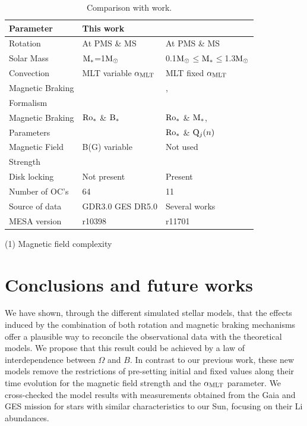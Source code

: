 \documentclass[fleqn,usenatbib]{mnras}
\begin{document}
\begin{table}
	\centering
	\caption{Comparison with \cite{Gossage2021} work.}
	\label{tab:gassage_vs_navarro}
        \begin{threeparttable}
	\begin{tabular}{lll} 
		\hline
		Parameter & This work & \cite{Gossage2021}\\
		\hline
            
		Rotation & At PMS \& MS & At PMS \& MS\\
  		Solar Mass & $\mathrm{M}_*$=1$\mathrm{M}_\odot$ & 0.1$\mathrm{M}_\odot$$\le$$\mathrm{M}_*$$\le$1.3$\mathrm{M}_\odot$ \\
		Convection & MLT variable $\alpha_{{\rm MLT}}$ & MLT fixed $\alpha_{{\rm MLT}}$\\
		Magnetic Braking & \cite{Gallet2013} & \cite{Matt2015}, \\ Formalism & & \cite{Garraffo2018}\\
            Magnetic Braking & $\mathrm{Ro}_*$ \& $\mathrm{B}_*$ & $\mathrm{Ro}_*$ \& $\mathrm{M}_*$, \\ Parameters & & $\mathrm{Ro}_*$ \& $\mathrm{Q}_j(n)$\tnote{(1)}\\
		Magnetic Field & B(G) variable & Not used\\ Strength & & \\
            Disk locking & Not present & Present\\
            Number of OC's & 64 & 11 \\
            Source of data & GDR3.0 GES DR5.0 & Several works \\
            MESA version & r10398 & r11701\\
		\hline
	\end{tabular}
        \end{threeparttable}
        \begin{tablenotes}\footnotesize
        \item (1) Magnetic field complexity
        \end{tablenotes}
\end{table}


\section{Conclusions and future works} \label{sec_conclusions}
We have shown, through the different simulated stellar models, that the effects induced by the combination of both rotation and magnetic braking mechanisms offer a plausible way to reconcile the observational data with the theoretical models. We propose that this result could be achieved by a law of interdependence between $\Omega$ and $B$. In contrast to our previous work, these new models remove the restrictions of pre-setting initial and fixed values along their time evolution for the magnetic field strength and the $\alpha_{\mathrm{MLT}}$ parameter. We cross-checked the model results with measurements obtained from the Gaia and GES mission for stars with similar characteristics to our Sun, focusing on their Li abundances.
\end{document}
